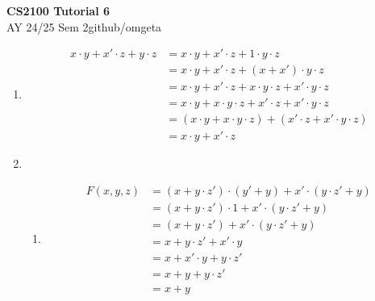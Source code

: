 \documentclass[12pt, a4paper]{article}
\newcommand{\mytitle}{CS2100 Tutorial 6}
\newcommand{\myauthor}{github/omgeta}
\newcommand{\mydate}{AY 24/25 Sem 2}
\begin{document}
\raggedright
\footnotesize
\begin{center}
{\normalsize{\textbf{\mytitle}}} \\
{\footnotesize{\mydate\hspace{2pt}\textemdash\hspace{2pt}\myauthor}}
\end{center}
\begin{enumerate}[Q\arabic*.]
  \item 
    \begin{align*}
      x\cdot y + x'\cdot z + y\cdot z &= x\cdot y + x'\cdot z + 1\cdot y\cdot z\tag*{(Identity)}\\
                                      &= x\cdot y + x'\cdot z + (x+x')\cdot y \cdot z\tag*{(Complement)}\\
                                      &= x\cdot y + x'\cdot z + x\cdot y \cdot z + x'\cdot y \cdot z\tag*{(Distributive)}\\
                                      &= x\cdot y + x\cdot y \cdot z + x'\cdot z + x'\cdot y \cdot z\tag*{(Commutative)}\\
                                      &= (x\cdot y + x\cdot y \cdot z) + (x'\cdot z + x'\cdot y \cdot z)\tag*{(Associative)}\\
                                      &= x\cdot y + x'\cdot z\tag*{(Absorption 1)}
    \end{align*}

  \item 
    \begin{enumerate}[(\alph*.)]
      \item 
        \begin{align*}
          F(x,y,z) &= (x+y\cdot z')\cdot (y' + y) + x'\cdot(y\cdot z' + y)\\
                   &= (x+y\cdot z')\cdot 1 + x'\cdot(y\cdot z' + y)\tag*{(Complement law)}\\ 
                   &= (x+y\cdot z') + x'\cdot(y\cdot z' + y)\tag*{(Identity law)}\\ 
                   &= x + y\cdot z' + x'\cdot y\tag*{(Absorption 1)}\\
                   &= x + x'\cdot y + y\cdot z'\tag*{(Commutative law)}\\
                   &= x + y + y\cdot z'\tag*{(Absorption 2)}\\
                   &= x + y\tag*{(Absorption 1)}
        \end{align*}


\end{enumerate}
\end{enumerate}
\end{document}
